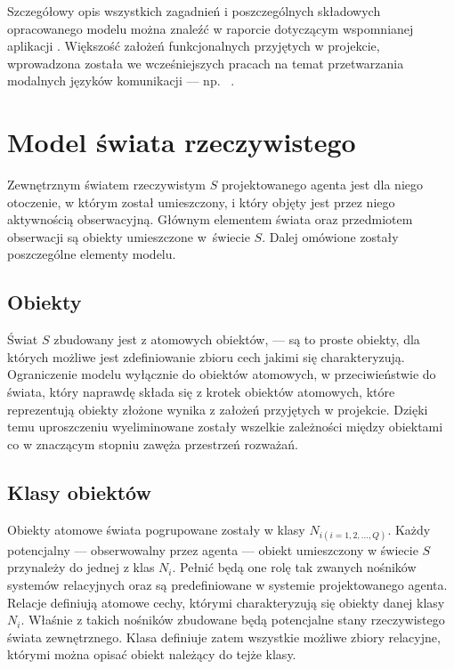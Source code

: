 Szczegółowy opis wszystkich zagadnień i poszczególnych składowych opracowanego modelu można znaleźć w raporcie dotyczącym wspomnianej aplikacji \cite{raport}. Większość założeń funkcjonalnych przyjętych w projekcie, wprowadzona została we wcześniejszych pracach na temat przetwarzania modalnych języków komunikacji --- np.\ \cite{kat99} \cite{kat07}.


\section{Model świata rzeczywistego}

Zewnętrznym światem rzeczywistym $ S $ projektowanego agenta jest dla niego otoczenie, w którym został umieszczony, i który objęty jest przez niego aktywnością obserwacyjną. Głównym elementem świata oraz przedmiotem obserwacji są obiekty umieszczone w~świecie $ S $. Dalej omówione zostały poszczególne elementy modelu.


	\subsection{Obiekty}
	
	Świat $ S $ zbudowany jest z atomowych obiektów, --- są to proste obiekty, dla których możliwe jest zdefiniowanie zbioru cech jakimi się charakteryzują. Ograniczenie modelu wyłącznie do obiektów atomowych, w przeciwieństwie do świata, który naprawdę składa się z krotek obiektów atomowych, które reprezentują obiekty złożone wynika z założeń przyjętych w projekcie. Dzięki temu uproszczeniu wyeliminowane zostały wszelkie zależności między obiektami co w znaczącym stopniu zawęża przestrzeń rozważań.
	
	
	\subsection{Klasy obiektów}
	
	Obiekty atomowe świata pogrupowane zostały w klasy $ N_{i(i=1,2,...,Q)} $. Każdy potencjalny --- obserwowalny przez agenta --- obiekt umieszczony w świecie $ S $ przynależy do jednej z klas $ N_i $. Pełnić będą one rolę tak zwanych nośników systemów relacyjnych oraz są predefiniowane w systemie projektowanego agenta. Relacje definiują atomowe cechy, którymi charakteryzują się obiekty danej klasy $ N_i $. Właśnie z takich nośników zbudowane będą potencjalne stany rzeczywistego świata zewnętrznego. Klasa definiuje zatem wszystkie możliwe zbiory relacyjne, którymi można opisać obiekt należący do tejże klasy.
	
